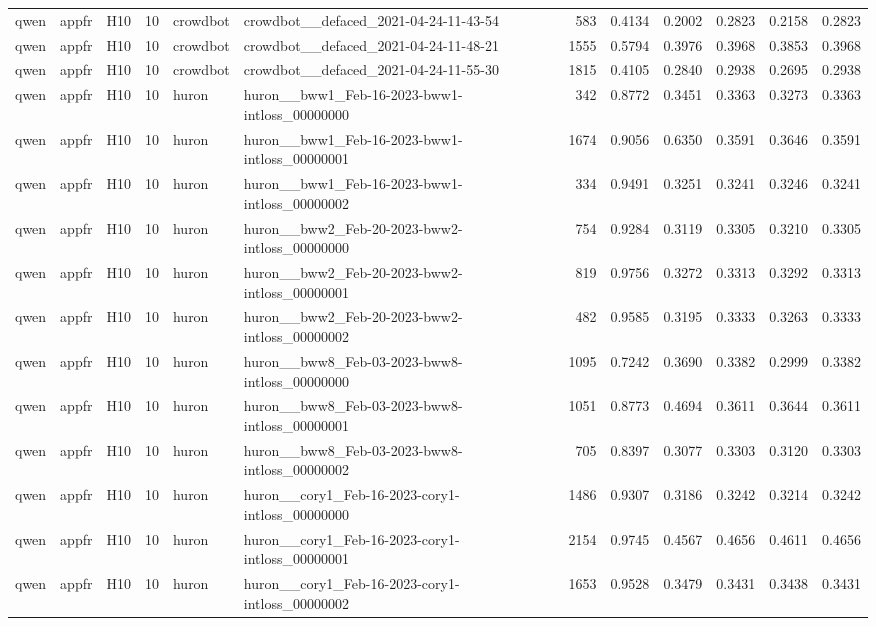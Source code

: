 \begin{table}[tbp]
\begin{tabular}{lllrllrrrrrr}
qwen & appfr & H10 & 10 & crowdbot & crowdbot\_\_defaced\_2021-04-24-11-43-54 & 583 & 0.4134 & 0.2002 & 0.2823 & 0.2158 & 0.2823 \\
qwen & appfr & H10 & 10 & crowdbot & crowdbot\_\_defaced\_2021-04-24-11-48-21 & 1555 & 0.5794 & 0.3976 & 0.3968 & 0.3853 & 0.3968 \\
qwen & appfr & H10 & 10 & crowdbot & crowdbot\_\_defaced\_2021-04-24-11-55-30 & 1815 & 0.4105 & 0.2840 & 0.2938 & 0.2695 & 0.2938 \\
qwen & appfr & H10 & 10 & huron & huron\_\_bww1\_Feb-16-2023-bww1-intloss\_00000000 & 342 & 0.8772 & 0.3451 & 0.3363 & 0.3273 & 0.3363 \\
qwen & appfr & H10 & 10 & huron & huron\_\_bww1\_Feb-16-2023-bww1-intloss\_00000001 & 1674 & 0.9056 & 0.6350 & 0.3591 & 0.3646 & 0.3591 \\
qwen & appfr & H10 & 10 & huron & huron\_\_bww1\_Feb-16-2023-bww1-intloss\_00000002 & 334 & 0.9491 & 0.3251 & 0.3241 & 0.3246 & 0.3241 \\
qwen & appfr & H10 & 10 & huron & huron\_\_bww2\_Feb-20-2023-bww2-intloss\_00000000 & 754 & 0.9284 & 0.3119 & 0.3305 & 0.3210 & 0.3305 \\
qwen & appfr & H10 & 10 & huron & huron\_\_bww2\_Feb-20-2023-bww2-intloss\_00000001 & 819 & 0.9756 & 0.3272 & 0.3313 & 0.3292 & 0.3313 \\
qwen & appfr & H10 & 10 & huron & huron\_\_bww2\_Feb-20-2023-bww2-intloss\_00000002 & 482 & 0.9585 & 0.3195 & 0.3333 & 0.3263 & 0.3333 \\
qwen & appfr & H10 & 10 & huron & huron\_\_bww8\_Feb-03-2023-bww8-intloss\_00000000 & 1095 & 0.7242 & 0.3690 & 0.3382 & 0.2999 & 0.3382 \\
qwen & appfr & H10 & 10 & huron & huron\_\_bww8\_Feb-03-2023-bww8-intloss\_00000001 & 1051 & 0.8773 & 0.4694 & 0.3611 & 0.3644 & 0.3611 \\
qwen & appfr & H10 & 10 & huron & huron\_\_bww8\_Feb-03-2023-bww8-intloss\_00000002 & 705 & 0.8397 & 0.3077 & 0.3303 & 0.3120 & 0.3303 \\
qwen & appfr & H10 & 10 & huron & huron\_\_cory1\_Feb-16-2023-cory1-intloss\_00000000 & 1486 & 0.9307 & 0.3186 & 0.3242 & 0.3214 & 0.3242 \\
qwen & appfr & H10 & 10 & huron & huron\_\_cory1\_Feb-16-2023-cory1-intloss\_00000001 & 2154 & 0.9745 & 0.4567 & 0.4656 & 0.4611 & 0.4656 \\
qwen & appfr & H10 & 10 & huron & huron\_\_cory1\_Feb-16-2023-cory1-intloss\_00000002 & 1653 & 0.9528 & 0.3479 & 0.3431 & 0.3438 & 0.3431 \\

\end{tabular}
\end{table}

